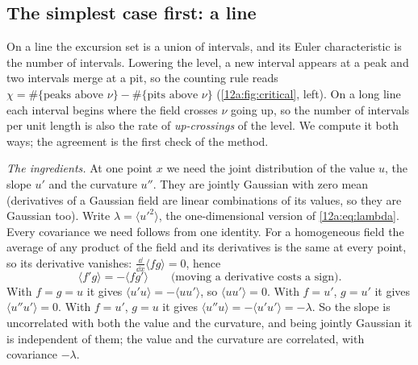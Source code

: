 \subsection{The simplest case first: a line}
\label{12a:sec:rice}

On a line the excursion set is a union of intervals, and its Euler characteristic is the number of
intervals. Lowering the level, a new interval appears at a peak and two intervals merge at a pit, so the
counting rule reads $\chi=\#\{\text{peaks above }\nu\}-\#\{\text{pits above }\nu\}$ (\cref{12a:fig:critical},
left). On a long line each interval begins where the field crosses $\nu$ going up, so the number of
intervals per unit length is also the rate of \emph{up-crossings} of the level. We compute it both ways; the
agreement is the first check of the method.

\emph{The ingredients.} At one point $x$ we need the joint distribution of the value $u$, the slope $u'$ and
the curvature $u''$. They are jointly Gaussian with zero mean (derivatives of a Gaussian field are linear
combinations of its values, so they are Gaussian too). Write $\lambda=\langle u'^2\rangle$, the
one-dimensional version of \eqref{12a:eq:lambda}. Every covariance we need follows from one identity. For a
homogeneous field the average of any product of the field and its derivatives is the same at every point, so
its derivative vanishes: $\frac{\dd}{\dd x}\langle fg\rangle=0$, hence
\begin{equation}
  \langle f'g\rangle=-\langle fg'\rangle\qquad\text{(moving a derivative costs a sign)}.
  \label{12a:eq:move}
\end{equation}
With $f=g=u$ it gives $\langle u'u\rangle=-\langle uu'\rangle$, so $\langle uu'\rangle=0$. With $f=u'$, $g=u'$
it gives $\langle u''u'\rangle=0$. With $f=u'$, $g=u$ it gives $\langle u''u\rangle=-\langle u'u'\rangle=-\lambda$.
So the slope is uncorrelated with both the value and the curvature, and being jointly Gaussian it is
independent of them; the value and the curvature are correlated, with covariance $-\lambda$.

